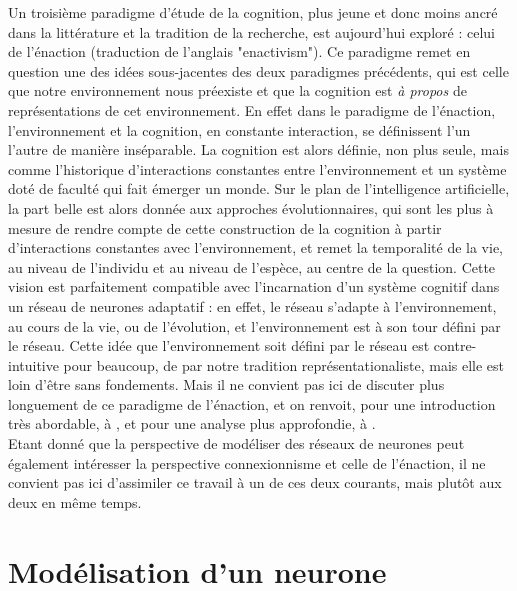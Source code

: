 \documentclass[12pt]{scrartcl}
\begin{document}
Un troisième paradigme d'étude de la cognition, plus jeune et donc moins ancré dans la littérature et la tradition de la recherche, est aujourd'hui exploré : celui de l'énaction (traduction de l'anglais "enactivism"). Ce paradigme remet en question une des idées sous-jacentes des deux paradigmes précédents, qui est celle que notre environnement nous préexiste et que la cognition est \textit{à propos} de représentations de cet environnement. En effet dans le paradigme de l'énaction, l'environnement et la cognition, en constante interaction, se définissent l'un l'autre de manière inséparable. La cognition est alors définie, non plus seule, mais comme l'historique d'interactions constantes entre l'environnement et un système doté de faculté qui fait émerger un monde. Sur le plan de l'intelligence artificielle, la part belle est alors donnée aux approches évolutionnaires, qui sont les plus à mesure de rendre compte de cette construction de la cognition à partir d'interactions constantes avec l'environnement, et remet la temporalité de la vie, au niveau de l'individu et au niveau de l'espèce, au centre de la question. Cette vision est parfaitement compatible avec l'incarnation d'un système cognitif dans un réseau de neurones adaptatif : en effet, le réseau s'adapte à l'environnement, au cours de la vie, ou de l'évolution, et l'environnement est à son tour défini par le réseau. Cette idée que l'environnement soit défini par le réseau est contre-intuitive pour beaucoup, de par notre tradition représentationaliste, mais elle est loin d'être sans fondements. Mais il ne convient pas ici de discuter plus longuement de ce paradigme de l'énaction, et on renvoit, pour une introduction très abordable, à \cite{Varelacarto}, et pour une analyse plus approfondie, à \cite{treeofknowledge}.\\

Etant donné que la perspective de modéliser des réseaux de neurones peut également intéresser la perspective connexionnisme et celle de l'énaction, il ne convient pas ici d'assimiler ce travail à un de ces deux courants, mais plutôt aux deux en même temps. 


\pagebreak

\part{Modélisation d'un neurone}
\end{document}
